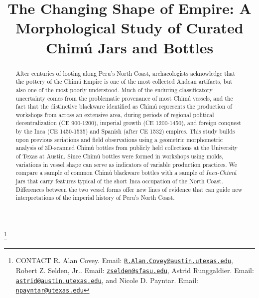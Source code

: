 \documentclass[]{interact}
\theoremstyle{plain}%
\theoremstyle{definition}
\theoremstyle{remark}
\begin{document}

\title{The Changing Shape of Empire: A Morphological Study of Curated
Chimú Jars and Bottles}


\author{
}

\thanks{CONTACT R. Alan
Covey. Email: \href{mailto:R.Alan.Covey@austin.utexas.edu}{\nolinkurl{R.Alan.Covey@austin.utexas.edu}}, Robert
Z. Selden,
Jr.. Email: \href{mailto:zselden@sfasu.edu}{\nolinkurl{zselden@sfasu.edu}}, Astrid
Runggaldier. Email: \href{mailto:astrid@austin.utexas.edu}{\nolinkurl{astrid@austin.utexas.edu}}, and
Nicole D.
Payntar. Email: \href{mailto:npayntar@utexas.edu}{\nolinkurl{npayntar@utexas.edu}}}

\maketitle

\begin{abstract}
After centuries of looting along Peru's North Coast, archaeologists
acknowledge that the pottery of the Chimú Empire is one of the most
collected Andean artifacts, but also one of the most poorly understood.
Much of the enduring classificatory uncertainty comes from the
problematic provenance of most Chimú vessels, and the fact that the
distinctive blackware identified as Chimú represents the production of
workshops from across an extensive area, during periods of regional
political decentralization (CE 900-1200), imperial growth (CE
1200-1450), and foreign conquest by the Inca (CE 1450-1535) and Spanish
(after CE 1532) empires. This study builds upon previous seriations and
field observations using a geometric morphometric analysis of 3D-scanned
Chimú bottles from publicly held collections at the University of Texas
at Austin. Since Chimú bottles were formed in workshops using molds,
variations in vessel shape can serve as indicators of variable
production practices. We compare a sample of common Chimú blackware
bottles with a sample of \emph{Inca-Chimú} jars that carry features
typical of the short Inca occupation of the North Coast. Differences
between the two vessel forms offer new lines of evidence that can guide
new interpretations of the imperial history of Peru's North Coast.
\end{abstract}
\end{document}
